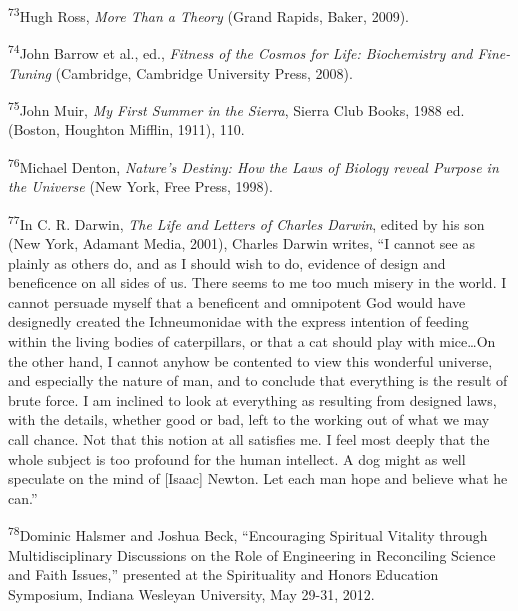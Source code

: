\textsuperscript{73}Hugh Ross, \textit{More Than a Theory }(Grand
Rapids, Baker, 2009).


\textsuperscript{74}John Barrow et al., ed., \textit{Fitness of the
Cosmos for Life: Biochemistry and Fine-Tuning }(Cambridge, Cambridge
University Press, 2008).


\textsuperscript{75}John Muir, \textit{My First Summer in the Sierra},
Sierra Club Books, 1988 ed.\textit{ }(Boston, Houghton Mifflin, 1911),
110.


\textsuperscript{76}Michael Denton, \textit{Nature’s Destiny: How the
Laws of Biology reveal Purpose in the Universe }(New York, Free Press,
1998).


\textsuperscript{77}In C. R. Darwin, \textit{The Life and Letters of
Charles Darwin}, edited by his son\textit{ }(New York, Adamant Media,
2001), Charles Darwin writes, “I cannot see as plainly as others do,
and as I should wish to do, evidence of design and beneficence on all
sides of us. There seems to me too much misery in the world.  I cannot
persuade myself that a beneficent and omnipotent God would have
designedly created the Ichneumonidae with the express intention of
feeding within the living bodies of caterpillars, or that a cat should
play with mice…On the other hand, I cannot anyhow be contented to view
this wonderful universe, and especially the nature of man, and to
conclude that everything is the result of brute force. I am inclined to
look at everything as resulting from designed laws, with the details,
whether good or bad, left to the working out of what we may call
chance. Not that this notion at all satisfies me. I feel most deeply
that the whole subject is too profound for the human intellect. A dog
might as well speculate on the mind of [Isaac] Newton. Let each man
hope and believe what he can.”


\textsuperscript{78}Dominic Halsmer and Joshua Beck, “Encouraging
Spiritual Vitality through Multidisciplinary Discussions on the Role of
Engineering in Reconciling Science and Faith Issues,” presented at the
Spirituality and Honors Education Symposium, Indiana Wesleyan
University, May 29-31, 2012.



